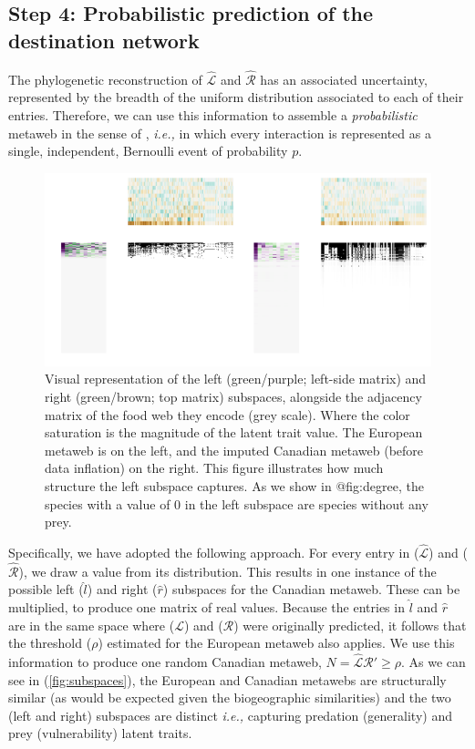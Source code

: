 \subsection{Step 4: Probabilistic prediction of the destination
network}\label{step-4-probabilistic-prediction-of-the-destination-network}

The phylogenetic reconstruction of \(\hat{\mathscr{L}}\) and
\(\hat{\mathscr{R}}\) has an associated uncertainty, represented by the
breadth of the uniform distribution associated to each of their entries.
Therefore, we can use this information to assemble a
\emph{probabilistic} metaweb in the sense of \cite{Poisot2016StrPro},
\emph{i.e.,} in which every interaction is represented as a single,
independent, Bernoulli event of probability \(p\).

\begin{figure}[h]
    \centering
    \includegraphics[width=\textwidth]{figures/figure-subspaces.png}
    \caption{Visual representation of the left (green/purple; left-side
matrix) and right (green/brown; top matrix) subspaces, alongside the
adjacency matrix of the food web they encode (grey scale). Where the
color saturation is the magnitude of the latent trait value. The
European metaweb is on the left, and the imputed Canadian metaweb
(before data inflation) on the right. This figure illustrates how much
structure the left subspace captures. As we show in @fig:degree, the
species with a value of 0 in the left subspace are species without any
prey.}
    \label{fig:subspaces}
\end{figure}

Specifically, we have adopted the following approach. For every entry in
($\hat{\mathscr{L}}$) and ($\hat{\mathscr{R}}$), we draw a value from
its distribution. This results in one instance of the possible left
($\hat{l}$) and right ($\hat{r}$) subspaces for
the Canadian metaweb. These can be multiplied, to produce one matrix of
real values. Because the entries in $\hat{l}$ and
$\hat{r}$ are in the same space where ($\mathscr{L}$) and
($\mathscr{R}$) were originally predicted, it follows that the threshold
($\rho$) estimated for the European metaweb also applies. We use this
information to produce one random Canadian metaweb,
\(N = \hat{\mathscr{L}}\hat{\mathscr{R}}' \ge \rho\). As we can see in
(\autoref{fig:subspaces}), the European and Canadian metawebs are structurally
similar (as would be expected given the biogeographic similarities) and
the two (left and right) subspaces are distinct \emph{i.e.,} capturing
predation (generality) and prey (vulnerability) latent traits.

